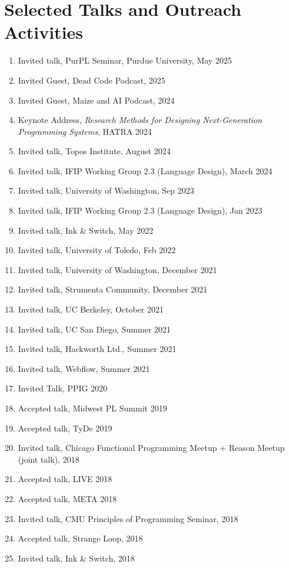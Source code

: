 \documentclass[10pt,letterpaper]{article}
\begin{document}
\section*{Selected Talks and Outreach Activities}
\begin{enumerate}
  \item Invited talk, PurPL Seminar, Purdue University, May 2025
  \item Invited Guest, Dead Code Podcast, 2025
  \item Invited Guest, Maize and AI Podcast, 2024
  \item Keynote Address, \textit{Research Methods for Designing Next-Generation Programming Systems}, HATRA 2024
  \item Invited talk, Topos Institute, August 2024
  \item Invited talk, IFIP Working Group 2.3 (Language Design), March 2024
  \item Invited talk, University of Washington, Sep 2023
  \item Invited talk, IFIP Working Group 2.3 (Language Design), Jan 2023
  \item Invited talk, Ink \& Switch, May 2022
  \item Invited talk, University of Toledo, Feb 2022
  \item Invited talk, University of Washington, December 2021
  \item Invited talk, Strumenta Community, December 2021
  \item Invited talk, UC Berkeley, October 2021
  \item Invited talk, UC San Diego, Summer 2021
  \item Invited talk, Hackworth Ltd., Summer 2021
  \item Invited talk, Webflow, Summer 2021
  \item Invited Talk, PPIG 2020
  \item Accepted talk, Midwest PL Summit 2019
  \item Accepted talk, TyDe 2019
  \item Invited talk, Chicago Functional Programming Meetup + Reason Meetup (joint talk), 2018
  \item Accepted talk, LIVE 2018
  \item Accepted talk, META 2018
  \item Invited talk, CMU Principles of Programming Seminar, 2018
  \item Accepted talk, Strange Loop, 2018
  \item Invited talk, Ink \& Switch, 2018

\end{enumerate}
\end{document}
